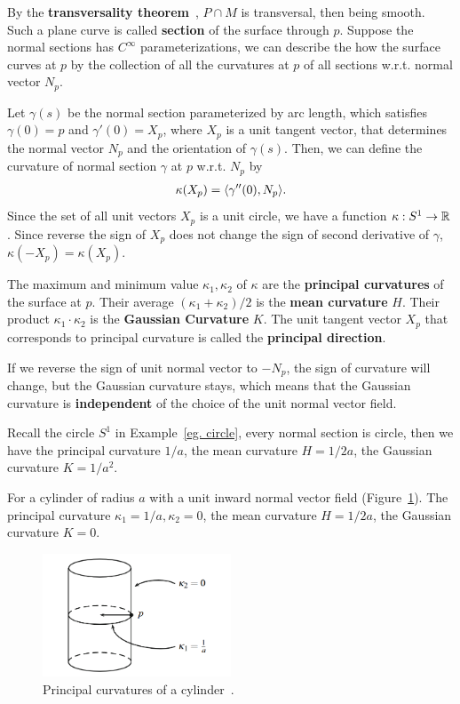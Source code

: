 By the \textbf{transversality theorem}~\cite{tu2010introduction}, 
$P \cap M$ is transversal, then being smooth. Such a plane curve is called \textbf{section} of
the surface through $p$. Suppose the normal sections has $C^\infty$ parameterizations, we can 
describe the how the surface curves at $p$ by the collection of all the curvatures at $p$ 
of all sections w.r.t. normal vector $N_p$.

Let $\gamma(s)$ be the normal section parameterized by arc length, which satisfies
$\gamma(0)=p$ and $\gamma'(0)=X_p$, where $X_p$ is a unit tangent vector, that determines the
normal vector $N_p$ and the orientation of $\gamma(s)$. Then, we can define the curvature of 
normal section $\gamma$ at $p$ w.r.t. $N_p$ by
\begin{align}
    \kappa(X_p)=\langle \gamma''(0), N_p \rangle. 
\end{align}
Since the set of all unit vectors $X_p$ is a unit circle,
we have a function $\kappa: S^1 \rightarrow {\mathbb{R}}$. Since reverse the sign of $X_p$ does not change
the sign of second derivative of $\gamma$, $\kappa(-X_p)=\kappa(X_p)$.

The maximum and minimum value $\kappa_1, \kappa_2$ of $\kappa$ are the \textbf{principal curvatures} of the surface at $p$.
Their average $(\kappa_1 + \kappa_2) / 2$ is the \textbf{mean curvature} $H$.
Their product $\kappa_1 \cdot \kappa_2$ is the \textbf{Gaussian Curvature} $K$.
The unit tangent vector $X_p$ that corresponds to principal curvature is called
the \textbf{principal direction}.
\begin{remark}
    If we reverse the sign of unit normal vector to $-N_p$, the sign of curvature will change,
    but the Gaussian curvature stays, which means that the Gaussian curvature
    is \textbf{independent} of the choice of the unit normal vector field.
\end{remark}
\begin{example}
    Recall the circle $S^1$ in Example~\ref{eg. circle}, every normal section is circle, then
    we have the principal curvature $1/a$,
    the mean curvature $H=1/2a$, the Gaussian curvature $K=1/{a^2}$.
\end{example}
\begin{example}
    For a cylinder of radius $a$ with a unit inward normal vector field (Figure~\ref{fig. cylinder}).
    The principal curvature $\kappa_1=1/a, \kappa_2=0$, the mean curvature $H=1/2a$,
    the Gaussian curvature $K=0$.
\end{example}
\begin{figure}
    \centering
    \includegraphics[width=0.5\textwidth]{../Lectures/Figures/cylinder.png}
    \caption{Principal curvatures of a cylinder~\cite[p. 19]{tuDifferentialGeometry2017}.}
    \label{fig. cylinder}
\end{figure}
